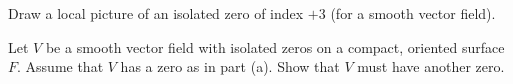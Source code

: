 \begin{alist}
\item Draw a local picture of an isolated zero of index $+3$ (for a
smooth vector field).
\item Let $V$ be a smooth vector field with isolated zeros on a
compact, oriented surface $F$. Assume that $V$ has a zero as in part
(a). Show that $V$ must have another zero.
\end{alist}
